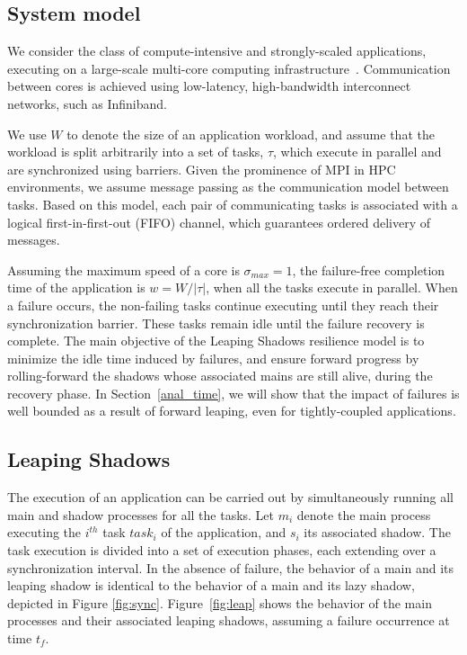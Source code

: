 \subsection {System model}

We consider the class of compute-intensive and strongly-scaled applications, executing on a large-scale multi-core computing infrastructure~\cite{doe_ascr_exascale_2011}. Communication between cores is achieved using low-latency, high-bandwidth interconnect networks, such as Infiniband. 

We use $W$ to denote the size of an application workload, and assume that the workload is split  arbitrarily into a set of tasks, $\tau$, which execute in parallel and are synchronized using barriers. Given the prominence of MPI in HPC environments, we assume message passing as the communication model between tasks. Based on this model, each pair of communicating tasks is associated with a logical first-in-first-out (FIFO) channel, which guarantees ordered delivery of messages.

Assuming the maximum speed of a core is $\sigma_{max}=1$, the failure-free completion time of the application is $w = W/|\tau|$, when all the tasks execute in parallel. When a failure occurs, the non-failing tasks continue executing until they reach their synchronization barrier. These tasks remain idle until the failure recovery is complete. 
The main objective of the Leaping Shadows resilience model is to minimize the idle time induced by failures, 
and ensure forward progress by rolling-forward the shadows whose associated mains are still alive, during the recovery phase. In Section~\ref{anal_time}, we will show that the impact of failures is well bounded as a result of forward leaping, even for tightly-coupled applications.






\subsection {Leaping Shadows}

The execution of an application can be carried out by simultaneously running all main and shadow processes for all the tasks. Let $m_i$ denote the main process executing the $i^{th}$ task $task_i$ of the application, and $s_i$ its associated shadow. The task execution is divided into a set of execution phases, each extending over a synchronization interval. In the absence of failure, the behavior of a main  and its leaping shadow is identical to the behavior of a main and its lazy shadow, depicted in Figure \ref{fig:sync}. Figure~\ref{fig:leap} shows the behavior of the main processes and their associated leaping shadows, assuming a failure occurrence at time $t_f$. 


